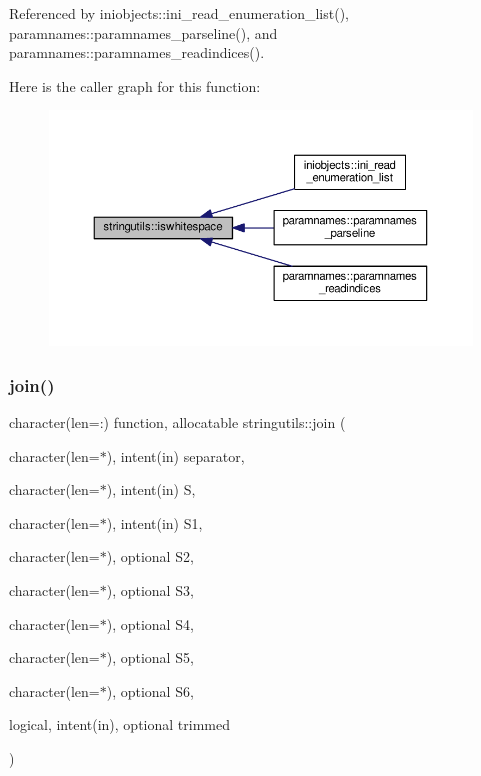 Referenced by iniobjects\+::ini\+\_\+read\+\_\+enumeration\+\_\+list(), paramnames\+::paramnames\+\_\+parseline(), and paramnames\+::paramnames\+\_\+readindices().

Here is the caller graph for this function\+:
\nopagebreak
\begin{figure}[H]
\begin{center}
\leavevmode
\includegraphics[width=350pt]{namespacestringutils_ae4eb174b5b8dcf64a0a61be0519ea343_icgraph}
\end{center}
\end{figure}
\mbox{\label{namespacestringutils_a29f32cf04e0c44fc8ee8dfa9819b915d}} 
\subsubsection{\texorpdfstring{join()}{join()}}
{\footnotesize\ttfamily character(len=\+:) function, allocatable stringutils\+::join (\begin{DoxyParamCaption}\item[{character(len=$\ast$), intent(in)}]{separator,  }\item[{character(len=$\ast$), intent(in)}]{S,  }\item[{character(len=$\ast$), intent(in)}]{S1,  }\item[{character(len=$\ast$), optional}]{S2,  }\item[{character(len=$\ast$), optional}]{S3,  }\item[{character(len=$\ast$), optional}]{S4,  }\item[{character(len=$\ast$), optional}]{S5,  }\item[{character(len=$\ast$), optional}]{S6,  }\item[{logical, intent(in), optional}]{trimmed }\end{DoxyParamCaption})}



